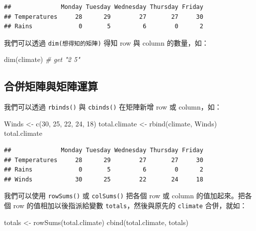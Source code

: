 \documentclass[
]{book}
\newenvironment{Shaded}{\begin{snugshade}}{\end{snugshade}}
\newcommand{\CommentTok}[1]{\textcolor[rgb]{0.56,0.35,0.01}{\textit{#1}}}
\newcommand{\DecValTok}[1]{\textcolor[rgb]{0.00,0.00,0.81}{#1}}
\newcommand{\FunctionTok}[1]{\textcolor[rgb]{0.00,0.00,0.00}{#1}}
\newcommand{\NormalTok}[1]{#1}
\newcommand{\OtherTok}[1]{\textcolor[rgb]{0.56,0.35,0.01}{#1}}
\theoremstyle{definition}
\theoremstyle{remark}
\begin{document}
\begin{verbatim}
##              Monday Tuesday Wednesday Thursday Friday
## Temperatures     28      29        27       27     30
## Rains             0       5         6        0      2
\end{verbatim}

我們可以透過 \texttt{dim(想得知的矩陣)} 得知 row 與 column 的數量，如：

\begin{Shaded}
\begin{Highlighting}[]
\FunctionTok{dim}\NormalTok{(climate)  }\CommentTok{\# get "2 5"}
\end{Highlighting}
\end{Shaded}

\hypertarget{ux5408ux4f75ux77e9ux9663ux8207ux77e9ux9663ux904bux7b97}{%
\subsection{合併矩陣與矩陣運算}\label{ux5408ux4f75ux77e9ux9663ux8207ux77e9ux9663ux904bux7b97}}

我們可以透過 \texttt{rbinds()} 與 \texttt{cbinds()} 在矩陣新增 row 或 column，如：

\begin{Shaded}
\begin{Highlighting}[]
\NormalTok{Winds }\OtherTok{\textless{}{-}} \FunctionTok{c}\NormalTok{(}\DecValTok{30}\NormalTok{, }\DecValTok{25}\NormalTok{, }\DecValTok{22}\NormalTok{, }\DecValTok{24}\NormalTok{, }\DecValTok{18}\NormalTok{)}
\NormalTok{total.climate }\OtherTok{\textless{}{-}} \FunctionTok{rbind}\NormalTok{(climate, Winds)}
\NormalTok{total.climate}
\end{Highlighting}
\end{Shaded}

\begin{verbatim}
##              Monday Tuesday Wednesday Thursday Friday
## Temperatures     28      29        27       27     30
## Rains             0       5         6        0      2
## Winds            30      25        22       24     18
\end{verbatim}

我們可以使用 \texttt{rowSums()} 或 \texttt{colSums()} 把各個 row 或 column 的值加起來。把各個 row 的值相加以後指派給變數 \texttt{totals}，然後與原先的 \texttt{climate} 合併，就如：

\begin{Shaded}
\begin{Highlighting}[]
\NormalTok{totals }\OtherTok{\textless{}{-}} \FunctionTok{rowSums}\NormalTok{(total.climate)}
\FunctionTok{cbind}\NormalTok{(total.climate, totals)}
\end{Highlighting}
\end{Shaded}
\end{document}
